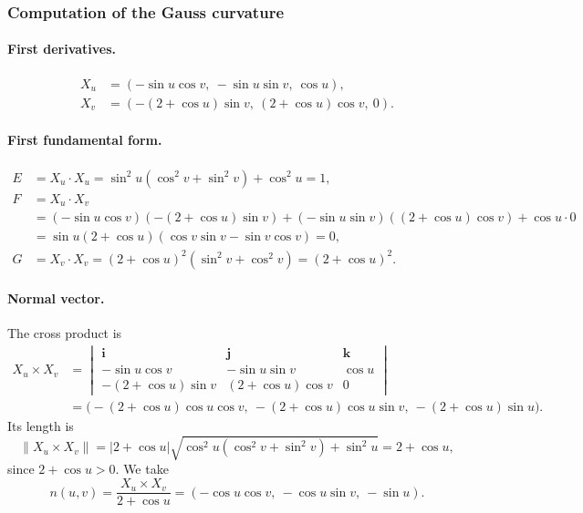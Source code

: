 \documentclass[12pt,a4paper]{article}
\theoremstyle{plain}
\theoremstyle{definition}      %
\begin{document}
\subsubsection*{Computation of the Gauss curvature}

\paragraph{First derivatives.}
\[
\begin{aligned}
	X_u &= (-\sin u\cos v,\ -\sin u\sin v,\ \cos u),\\[1mm]
	X_v &= (-(2+\cos u)\sin v,\ (2+\cos u)\cos v,\ 0).
\end{aligned}
\]

\paragraph{First fundamental form.}
\[
\begin{aligned}
	E &= X_u\cdot X_u
	= \sin^2 u(\cos^2 v+\sin^2 v)+\cos^2 u
	= 1,\\[1mm]
	F &= X_u\cdot X_v \\
	&= (-\sin u\cos v)(-(2+\cos u)\sin v)
	+(-\sin u\sin v)((2+\cos u)\cos v)
	+\cos u\cdot 0 \\
	&= \sin u(2+\cos u)(\cos v\sin v-\sin v\cos v)=0,\\[1mm]
	G &= X_v\cdot X_v
	= (2+\cos u)^2(\sin^2 v+\cos^2 v)
	= (2+\cos u)^2.
\end{aligned}
\]

\paragraph{Normal vector.}
The cross product is
\[
\begin{aligned}
	X_u\times X_v
	&= \begin{vmatrix}
		\mathbf{i} & \mathbf{j} & \mathbf{k} \\
		-\sin u\cos v & -\sin u\sin v & \cos u \\
		-(2+\cos u)\sin v & (2+\cos u)\cos v & 0
	\end{vmatrix} \\
	&= \bigl(-(2+\cos u)\cos u\cos v,\ -(2+\cos u)\cos u\sin v,\ -(2+\cos u)\sin u\bigr).
\end{aligned}
\]
Its length is
\[
\|X_u\times X_v\|
= |2+\cos u|\sqrt{\cos^2u(\cos^2v+\sin^2v)+\sin^2u}
= 2+\cos u,
\]
since $2+\cos u>0$. We take
\[
n(u,v)
= \frac{X_u\times X_v}{2+\cos u}
= (-\cos u\cos v,\ -\cos u\sin v,\ -\sin u).
\]
\end{document}
